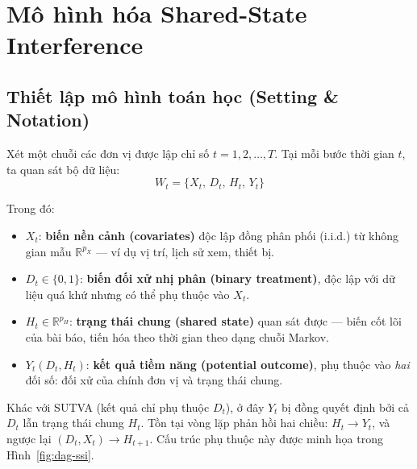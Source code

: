 \section{Mô hình hóa Shared-State Interference}

\subsection{Thiết lập mô hình toán học (Setting \& Notation)}

Xét một chuỗi các đơn vị được lập chỉ số \(t = 1, 2, \dots, T\). Tại mỗi bước thời gian \(t\), ta quan sát bộ dữ liệu:
\[
    W_t = \{X_t,\, D_t,\, H_t,\, Y_t\}
\]

Trong đó:
\begin{itemize}
    \item \(X_t\): \textbf{biến nền cảnh (covariates)} độc lập đồng phân phối (i.i.d.) từ không gian mẫu \(\mathbb{R}^{p_X}\) --- ví dụ vị trí, lịch sử xem, thiết bị.
    \item \(D_t \in \{0, 1\}\): \textbf{biến đối xử nhị phân (binary treatment)}, độc lập với dữ liệu quá khứ nhưng có thể phụ thuộc vào \(X_t\).
    \item \(H_t \in \mathbb{R}^{p_H}\): \textbf{trạng thái chung (shared state)} quan sát được --- biến cốt lõi của bài báo, tiến hóa theo thời gian theo dạng chuỗi Markov.
    \item \(Y_t(D_t, H_t)\): \textbf{kết quả tiềm năng (potential outcome)}, phụ thuộc vào \textit{hai} đối số: đối xử của chính đơn vị và trạng thái chung.
\end{itemize}

Khác với SUTVA (kết quả chỉ phụ thuộc \(D_t\)), \h{ơ} đây \(Y_t\) bị đồng quyết định bởi cả \(D_t\) lẫn trạng thái chung \(H_t\). Tồn tại vòng lặp phản hồi hai chiều: \(H_t \to Y_t\), và ngược lại \((D_t, X_t) \to H_{t+1}\). Cấu trúc phụ thuộc này được minh họa trong Hình~\ref{fig:dag-ssi}.

